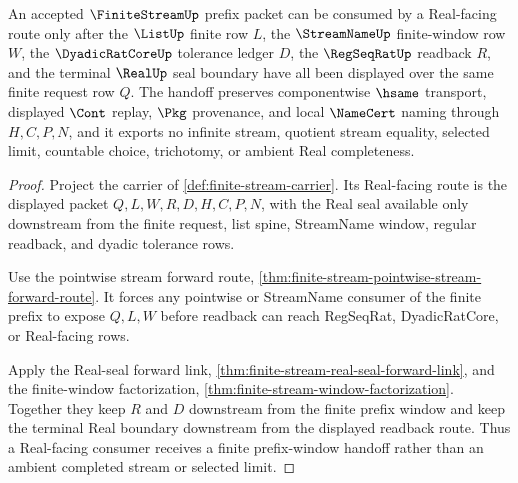 \begin{theorem}
\label{thm:finite-stream-prefix-window-real-handoff}
An accepted $\FiniteStreamUp$ prefix packet can be consumed by a Real-facing route only after the $\ListUp$ finite row $L$, the $\StreamNameUp$ finite-window row $W$, the $\DyadicRatCoreUp$ tolerance ledger $D$, the $\RegSeqRatUp$ readback $R$, and the terminal $\RealUp$ seal boundary have all been displayed over the same finite request row $Q$. The handoff preserves componentwise $\hsame$ transport, displayed $\Cont$ replay, $\Pkg$ provenance, and local $\NameCert$ naming through $H,C,P,N$, and it exports no infinite stream, quotient stream equality, selected limit, countable choice, trichotomy, or ambient Real completeness.
\end{theorem}
\begin{proof}
Project the carrier of \autoref{def:finite-stream-carrier}. Its Real-facing route is the displayed packet $Q,L,W,R,D,H,C,P,N$, with the Real seal available only downstream from the finite request, list spine, StreamName window, regular readback, and dyadic tolerance rows.

Use the pointwise stream forward route, \autoref{thm:finite-stream-pointwise-stream-forward-route}. It forces any pointwise or StreamName consumer of the finite prefix to expose $Q,L,W$ before readback can reach RegSeqRat, DyadicRatCore, or Real-facing rows.

Apply the Real-seal forward link, \autoref{thm:finite-stream-real-seal-forward-link}, and the finite-window factorization, \autoref{thm:finite-stream-window-factorization}. Together they keep $R$ and $D$ downstream from the finite prefix window and keep the terminal Real boundary downstream from the displayed readback route. Thus a Real-facing consumer receives a finite prefix-window handoff rather than an ambient completed stream or selected limit.
\end{proof}

